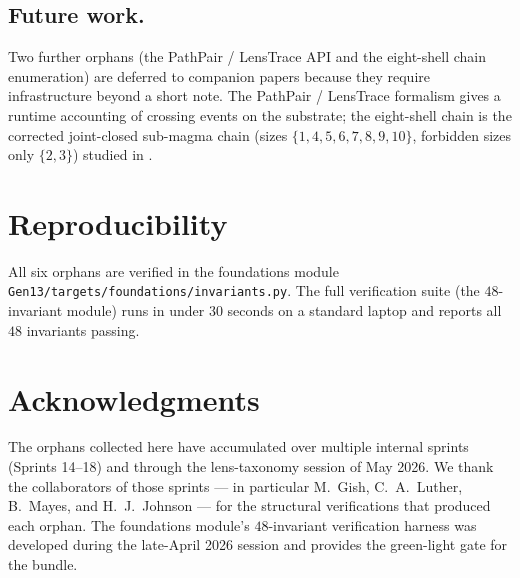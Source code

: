 \documentclass[11pt,reqno]{amsart}
\theoremstyle{plain}
\theoremstyle{definition}
\theoremstyle{remark}
\begin{document}
\subsection{Future work.}
Two further orphans (the PathPair / LensTrace API and the eight-shell
chain enumeration) are deferred to companion papers because they
require infrastructure beyond a short note. The PathPair / LensTrace
formalism gives a runtime accounting of crossing events on the
substrate; the eight-shell chain is the corrected joint-closed
sub-magma chain (sizes $\{1, 4, 5, 6, 7, 8, 9, 10\}$, forbidden sizes
only $\{2, 3\}$) studied in \cite{SandersGishFourCore}.

\section{Reproducibility}
\label{sec:repro}

All six orphans are verified in the foundations module
\texttt{Gen13/targets/foundations/invariants.py}. The full
verification suite (the $48$-invariant module) runs in under $30$
seconds on a standard laptop and reports
all $48$ invariants passing.

\section*{Acknowledgments}
The orphans collected here have accumulated over multiple internal
sprints (Sprints 14--18) and through the lens-taxonomy session of
May 2026. We thank the collaborators of those sprints --- in
particular M.~Gish, C.~A.~Luther, B.~Mayes, and H.~J.~Johnson --- for
the structural verifications that produced each orphan. The
foundations module's $48$-invariant verification harness was
developed during the late-April 2026 session and provides the
green-light gate for the bundle.
\end{document}
